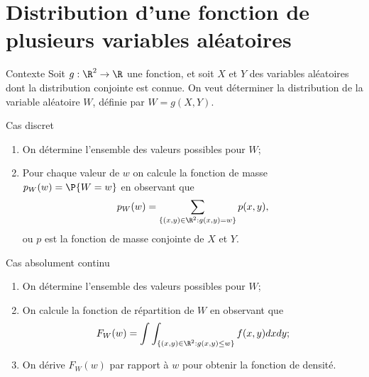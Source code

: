 \documentclass[nuit,charter,pied]{BeamerJS}
\begin{document}
\section[Distribution d'une fct.]{Distribution d'une fonction de plusieurs variables aléatoires}
\begin{frame}[t]{Contexte}
	Soit $g:\R^2\rightarrow\R$ une fonction, et soit $X$ et $Y$ des variables aléatoires dont la distribution conjointe est connue. On veut déterminer la distribution de la variable aléatoire $W$, définie par $W=g(X,Y)$.
\end{frame}
\begin{frame}[t]{Cas discret}
	\begin{enumerate}
		\item On détermine l'ensemble des valeurs possibles pour $W$;\\
		\item Pour chaque valeur de $w$ on calcule la fonction de masse $p_W(w)=\P{W=w}$ en observant que
		\[p_W(w)=\sum_{\{(x,y)\in\R^2:g(x,y)=w\}}p(x,y),\]
		ou $p$ est la fonction de masse conjointe de $X$ et $Y$.
	\end{enumerate}
\end{frame}
\begin{frame}[t]{Cas absolument continu}
	\begin{enumerate}
		\item On détermine l'ensemble des valeurs possibles pour $W$;\\
		\item On calcule la fonction de répartition de $W$ en observant que
		\[F_W(w)=\int\int_{\{(x,y)\in\R^2:g(x,y)\leq w\}}f(x,y)dxdy;\]
		\item On dérive $F_W(w)$ par rapport à $w$ pour obtenir la fonction de densité.\\
	\end{enumerate}
\end{frame}
\end{document}
